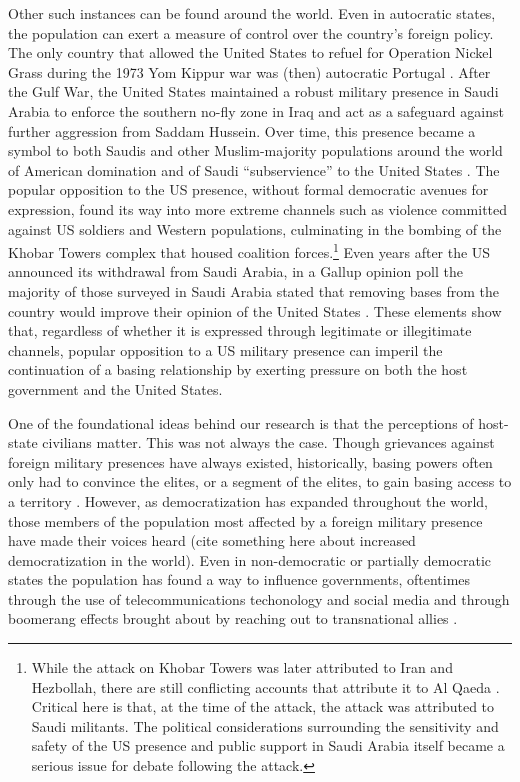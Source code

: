 {	Other such instances can be found around the world. Even in autocratic states, the population can exert a measure of control over the country's foreign policy. The only country that allowed the United States to refuel for Operation Nickel Grass during the 1973 Yom Kippur war was (then) autocratic Portugal \cite{sandars2000}.  After the Gulf War, the United States maintained a robust military presence in Saudi Arabia to enforce the southern no-fly zone in Iraq and act as a safeguard against further aggression from Saddam Hussein. Over time, this presence became a symbol to both Saudis and other Muslim-majority populations around the world of American domination and of Saudi ``subservience'' to the United States \cite{BBC2003}. The popular opposition to the US presence, without formal democratic avenues for expression, found its way into more extreme channels such as violence committed against US soldiers and Western populations, culminating in the bombing of the Khobar Towers complex that housed coalition forces.\footnote{While the attack on Khobar Towers was later attributed to Iran and Hezbollah, there are still conflicting accounts that attribute it to Al Qaeda \cite{NYT1996a, NYT1996b}. Critical here is that, at the time of the attack, the attack was attributed to Saudi militants. The political considerations surrounding the sensitivity and safety of the US presence and public support in Saudi Arabia itself became a serious issue for debate following the attack.} Even years after the US announced its withdrawal from Saudi Arabia, in a Gallup opinion poll the majority of those surveyed in Saudi Arabia stated that removing bases from the country would improve their opinion of the United States \cite{GallupSA2009}. These elements show that, regardless of whether it is expressed through legitimate or illegitimate channels, popular opposition to a US military presence can imperil the continuation of a basing relationship by exerting pressure on both the host government and the United States.

	

	One of the foundational ideas behind our research is that the perceptions of host-state civilians matter. This was not always the case. Though grievances against foreign military presences have always existed, historically, basing powers often only had to convince the elites, or a segment of the elites, to gain basing access to a territory \cite{Gillem2007}. However, as democratization has expanded throughout the world, those members of the population most affected by a foreign military presence have made their voices heard (cite something here about increased democratization in the world). Even in non-democratic or partially democratic states the population has found a way to influence governments, oftentimes through the use of telecommunications techonology and social media and through boomerang effects brought about by reaching out to transnational allies \cite{Keck1999,Steinert2017}.
	
}
